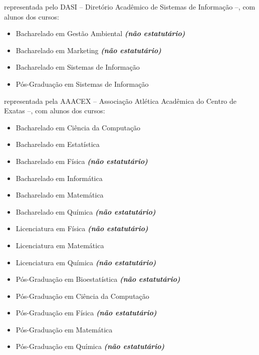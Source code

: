 \begin{article}
\begin{description}[noitemsep]
		\item[USP Leste - EACH] representada pelo DASI -- Diretório Acadêmico de Sistemas de Informação --, com alunos dos cursos:
		\begin{itemize}[noitemsep]
			\item Bacharelado em Gestão Ambiental \textbf{\textit{(não estatutário)}}
			\item Bacharelado em Marketing \textbf{\textit{(não estatutário)}}
			\item Bacharelado em Sistemas de Informação
			\item Pós-Graduação em Sistemas de Informação
		\end{itemize}

		\item[UEM] representada pela AAACEX -- Associação Atlética Acadêmica do Centro de Exatas --, com alunos dos cursos:
		\begin{itemize}[noitemsep]
			\item Bacharelado em Ciência da Computação
			\item Bacharelado em Estatística
			\item Bacharelado em Física \textbf{\textit{(não estatutário)}}
			\item Bacharelado em Informática
			\item Bacharelado em Matemática
			\item Bacharelado em Química \textbf{\textit{(não estatutário)}}
			\item Licenciatura em Física \textbf{\textit{(não estatutário)}}
			\item Licenciatura em Matemática
			\item Licenciatura em Química \textbf{\textit{(não estatutário)}}
			\item Pós-Graduação em Bioestatística \textbf{\textit{(não estatutário)}}
			\item Pós-Graduação em Ciência da Computação
			\item Pós-Graduação em Física \textbf{\textit{(não estatutário)}}
			\item Pós-Graduação em Matemática
			\item Pós-Graduação em Química \textbf{\textit{(não estatutário)}}
		\end{itemize}


\end{description}
\end{article}
